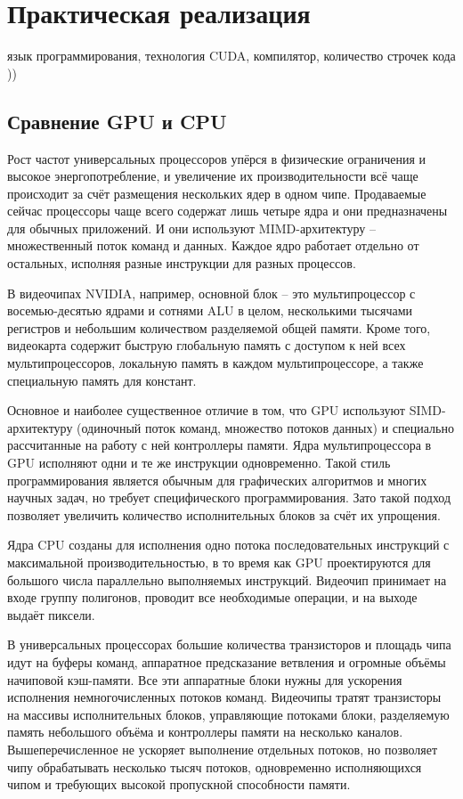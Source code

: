 \documentclass[a4paper,14pt,russian]{extreport}
\begin{document}
\chapter{Практическая реализация}  
язык программирования, технология CUDA, компилятор, количество строчек кода ))

\section{Сравнение GPU и CPU} 
\cite{poletaev} Рост частот универсальных процессоров упёрся в физические ограничения и высокое энергопотребление, и увеличение их производительности всё чаще происходит за счёт размещения нескольких ядер в одном чипе. Продаваемые сейчас процессоры чаще всего содержат лишь четыре ядра и они предназначены для обычных приложений. И они используют MIMD-архитектуру – множественный поток команд и данных. Каждое ядро работает отдельно от остальных, исполняя разные инструкции для разных процессов. 
\par
В видеочипах NVIDIA, например, основной блок – это мультипроцессор с восемью-десятью ядрами и сотнями ALU в целом, несколькими тысячами регистров и небольшим количеством разделяемой общей памяти. Кроме того, видеокарта содержит быструю глобальную память с доступом к ней всех мультипроцессоров, локальную память в каждом мультипроцессоре, а также специальную память для констант.
\par
Основное и наиболее существенное отличие в том, что GPU используют SIMD-архитектуру (одиночный поток команд, множество потоков данных) и специально рассчитанные на работу с ней контроллеры памяти. Ядра мультипроцессора в GPU исполняют одни и те же инструкции одновременно. Такой стиль программирования является обычным для графических алгоритмов и многих научных задач, но требует специфического программирования. Зато такой подход позволяет увеличить количество исполнительных блоков за счёт их упрощения. 
\par
Ядра CPU созданы для исполнения одно потока последовательных инструкций с максимальной производительностью, в то время как GPU проектируются для большого числа параллельно выполняемых инструкций. Видеочип принимает на входе группу полигонов, проводит все необходимые операции, и на выходе выдаёт пиксели.
\par
В универсальных процессорах большие количества транзисторов и площадь чипа идут на буферы команд, аппаратное предсказание ветвления и огромные объёмы начиповой кэш-памяти. Все эти аппаратные блоки нужны для ускорения исполнения немногочисленных потоков команд. Видеочипы тратят транзисторы на массивы исполнительных блоков, управляющие потоками блоки, разделяемую память небольшого объёма и контроллеры памяти на несколько каналов. Вышеперечисленное не ускоряет выполнение отдельных потоков, но позволяет чипу обрабатывать несколько тысяч потоков, одновременно исполняющихся чипом и требующих высокой пропускной способности памяти.
\end{document}
